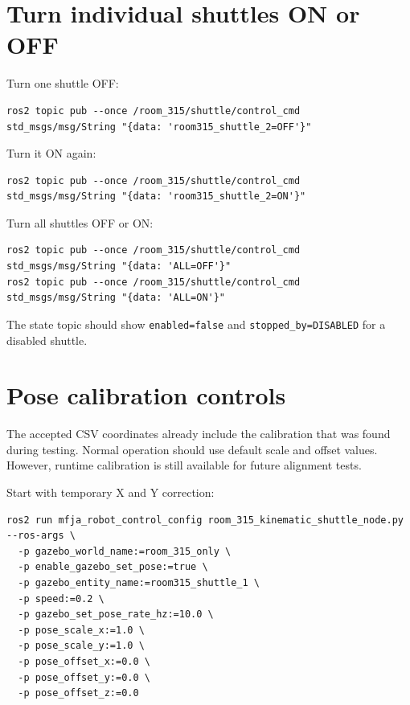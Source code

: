 \documentclass[12pt,a4paper]{report}
\begin{document}
\section{Turn individual shuttles ON or OFF}

Turn one shuttle OFF:

\begin{lstlisting}[style=terminalcode]
ros2 topic pub --once /room_315/shuttle/control_cmd std_msgs/msg/String "{data: 'room315_shuttle_2=OFF'}"
\end{lstlisting}

Turn it ON again:

\begin{lstlisting}[style=terminalcode]
ros2 topic pub --once /room_315/shuttle/control_cmd std_msgs/msg/String "{data: 'room315_shuttle_2=ON'}"
\end{lstlisting}

Turn all shuttles OFF or ON:

\begin{lstlisting}[style=terminalcode]
ros2 topic pub --once /room_315/shuttle/control_cmd std_msgs/msg/String "{data: 'ALL=OFF'}"
ros2 topic pub --once /room_315/shuttle/control_cmd std_msgs/msg/String "{data: 'ALL=ON'}"
\end{lstlisting}

The state topic should show \texttt{enabled=false} and
\texttt{stopped\_by=DISABLED} for a disabled shuttle.

\section{Pose calibration controls}

The accepted CSV coordinates already include the calibration that was found
during testing. Normal operation should use default scale and offset values.
However, runtime calibration is still available for future alignment tests.

Start with temporary X and Y correction:

\begin{lstlisting}[style=terminalcode]
ros2 run mfja_robot_control_config room_315_kinematic_shuttle_node.py --ros-args \
  -p gazebo_world_name:=room_315_only \
  -p enable_gazebo_set_pose:=true \
  -p gazebo_entity_name:=room315_shuttle_1 \
  -p speed:=0.2 \
  -p gazebo_set_pose_rate_hz:=10.0 \
  -p pose_scale_x:=1.0 \
  -p pose_scale_y:=1.0 \
  -p pose_offset_x:=0.0 \
  -p pose_offset_y:=0.0 \
  -p pose_offset_z:=0.0
\end{lstlisting}
\end{document}
